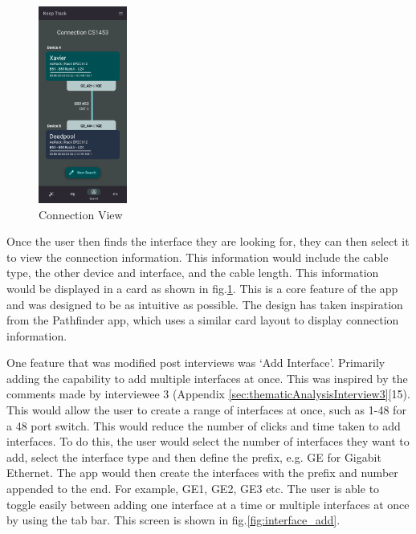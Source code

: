 \documentclass [11pt,a4paper]{article}
\begin{document}
\begin{figure}
    \centering
    \includegraphics[width=0.26\textwidth]{images/connection_display.png}
    \caption{Connection View}
    \label{fig:connection_card}
\end{figure}

Once the user then finds the interface they are looking for, they can then select it to view the connection information. This information would include the cable type, the other device and interface, and the cable length. This information would be displayed in a card as shown in fig.\ref{fig:connection_card}. This is a core feature of the app and was designed to be as intuitive as possible. The design has taken inspiration from the Pathfinder app, which uses a similar card layout to display connection information.

One feature that was modified post interviews was `Add Interface'. Primarily adding the capability to add multiple interfaces at once. This was inspired by the comments made by interviewee 3 (Appendix \ref{sec:thematicAnalysisInterview3}[15). This would allow the user to create a range of interfaces at once, such as 1-48 for a 48 port switch. This would reduce the number of clicks and time taken to add interfaces. To do this, the user would select the number of interfaces they want to add, select the interface type and then define the prefix, e.g. GE for Gigabit Ethernet. The app would then create the interfaces with the prefix and number appended to the end. For example, GE1, GE2, GE3 etc. The user is able to toggle easily between adding one interface at a time or multiple interfaces at once by using the tab bar. This screen is shown in fig.\ref{fig:interface_add}.
\end{document}
